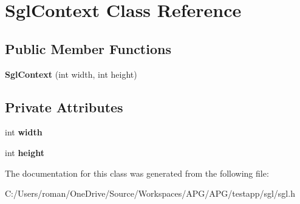 \hypertarget{class_sgl_context}{}\section{Sgl\+Context Class Reference}
\label{class_sgl_context}
\subsection*{Public Member Functions}
\begin{DoxyCompactItemize}
\item 
\hypertarget{class_sgl_context_a6e0dfc2a14db7ef1b7243a0eae10cd54}{}{\bfseries Sgl\+Context} (int width, int height)\label{class_sgl_context_a6e0dfc2a14db7ef1b7243a0eae10cd54}

\end{DoxyCompactItemize}
\subsection*{Private Attributes}
\begin{DoxyCompactItemize}
\item 
\hypertarget{class_sgl_context_ae57e6e2ce9c1330e689f750d8fd14289}{}int {\bfseries width}\label{class_sgl_context_ae57e6e2ce9c1330e689f750d8fd14289}

\item 
\hypertarget{class_sgl_context_a72b4441fc00564079a80c815be04f613}{}int {\bfseries height}\label{class_sgl_context_a72b4441fc00564079a80c815be04f613}

\end{DoxyCompactItemize}


The documentation for this class was generated from the following file\+:\begin{DoxyCompactItemize}
\item 
C\+:/\+Users/roman/\+One\+Drive/\+Source/\+Workspaces/\+A\+P\+G/\+A\+P\+G/testapp/sgl/sgl.\+h\end{DoxyCompactItemize}

